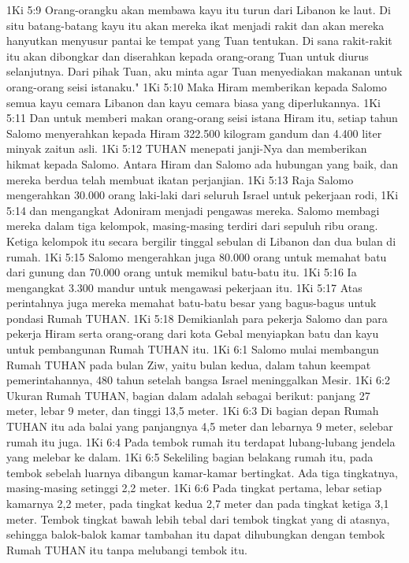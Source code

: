 1Ki 5:9  Orang-orangku akan membawa kayu itu turun dari Libanon ke laut. Di situ batang-batang kayu itu akan mereka ikat menjadi rakit dan akan mereka hanyutkan menyusur pantai ke tempat yang Tuan tentukan. Di sana rakit-rakit itu akan dibongkar dan diserahkan kepada orang-orang Tuan untuk diurus selanjutnya. Dari pihak Tuan, aku minta agar Tuan menyediakan makanan untuk orang-orang seisi istanaku."
1Ki 5:10  Maka Hiram memberikan kepada Salomo semua kayu cemara Libanon dan kayu cemara biasa yang diperlukannya.
1Ki 5:11  Dan untuk memberi makan orang-orang seisi istana Hiram itu, setiap tahun Salomo menyerahkan kepada Hiram 322.500 kilogram gandum dan 4.400 liter minyak zaitun asli.
1Ki 5:12  TUHAN menepati janji-Nya dan memberikan hikmat kepada Salomo. Antara Hiram dan Salomo ada hubungan yang baik, dan mereka berdua telah membuat ikatan perjanjian.
1Ki 5:13  Raja Salomo mengerahkan 30.000 orang laki-laki dari seluruh Israel untuk pekerjaan rodi,
1Ki 5:14  dan mengangkat Adoniram menjadi pengawas mereka. Salomo membagi mereka dalam tiga kelompok, masing-masing terdiri dari sepuluh ribu orang. Ketiga kelompok itu secara bergilir tinggal sebulan di Libanon dan dua bulan di rumah.
1Ki 5:15  Salomo mengerahkan juga 80.000 orang untuk memahat batu dari gunung dan 70.000 orang untuk memikul batu-batu itu.
1Ki 5:16  Ia mengangkat 3.300 mandur untuk mengawasi pekerjaan itu.
1Ki 5:17  Atas perintahnya juga mereka memahat batu-batu besar yang bagus-bagus untuk pondasi Rumah TUHAN.
1Ki 5:18  Demikianlah para pekerja Salomo dan para pekerja Hiram serta orang-orang dari kota Gebal menyiapkan batu dan kayu untuk pembangunan Rumah TUHAN itu.
1Ki 6:1  Salomo mulai membangun Rumah TUHAN pada bulan Ziw, yaitu bulan kedua, dalam tahun keempat pemerintahannya, 480 tahun setelah bangsa Israel meninggalkan Mesir.
1Ki 6:2  Ukuran Rumah TUHAN, bagian dalam adalah sebagai berikut: panjang 27 meter, lebar 9 meter, dan tinggi 13,5 meter.
1Ki 6:3  Di bagian depan Rumah TUHAN itu ada balai yang panjangnya 4,5 meter dan lebarnya 9 meter, selebar rumah itu juga.
1Ki 6:4  Pada tembok rumah itu terdapat lubang-lubang jendela yang melebar ke dalam.
1Ki 6:5  Sekeliling bagian belakang rumah itu, pada tembok sebelah luarnya dibangun kamar-kamar bertingkat. Ada tiga tingkatnya, masing-masing setinggi 2,2 meter.
1Ki 6:6  Pada tingkat pertama, lebar setiap kamarnya 2,2 meter, pada tingkat kedua 2,7 meter dan pada tingkat ketiga 3,1 meter. Tembok tingkat bawah lebih tebal dari tembok tingkat yang di atasnya, sehingga balok-balok kamar tambahan itu dapat dihubungkan dengan tembok Rumah TUHAN itu tanpa melubangi tembok itu.
